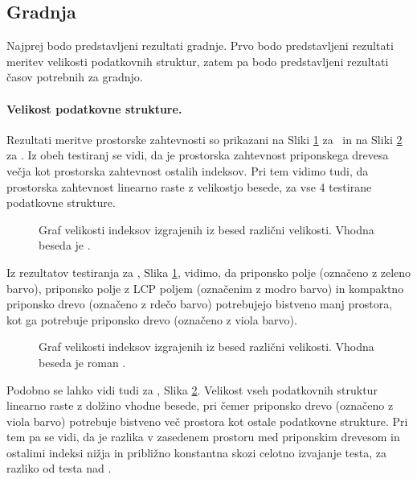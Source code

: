 \subsection{Gradnja}
Najprej bodo predstavljeni rezultati gradnje. Prvo bodo predstavljeni rezultati meritev velikosti podatkovnih struktur, zatem pa bodo predstavljeni rezultati časov potrebnih za gradnjo.

\paragraph{Velikost podatkovne strukture.}

Rezultati meritve prostorske zahtevnosti so prikazani na Sliki \ref{fig:VelikostGraf} za \DNK\ in na Sliki \ref{fig:VelikostGrafSLO} za \NK. Iz obeh testiranj se vidi, da je prostorska zahtevnost priponskega drevesa večja kot prostorska zahtevnost ostalih indeksov. Pri tem vidimo tudi, da prostorska zahtevnost linearno raste z velikostjo besede, za vse 4 testirane podatkovne strukture.

\begin{figure}[htb]
    \centering
    
    \caption{Graf velikosti indeksov izgrajenih iz besed različni velikosti. Vhodna beseda je \DNK.} 
    \label{fig:VelikostGraf}
\end{figure}

Iz rezultatov testiranja za \DNK, Slika \ref{fig:VelikostGraf}, vidimo, da priponsko polje (označeno z zeleno barvo), priponsko polje z LCP poljem (označenim z modro barvo) in kompaktno priponsko drevo (označeno z rdečo barvo) potrebujejo bistveno manj prostora, kot ga potrebuje priponsko drevo (označeno z viola barvo).

\begin{figure}[tb]
    \centering
    
    \caption{Graf velikosti indeksov izgrajenih iz besed različni velikosti. Vhodna beseda je roman \NK.} 
    \label{fig:VelikostGrafSLO}
\end{figure}

Podobno se lahko vidi tudi za \NK, Slika \ref{fig:VelikostGrafSLO}. Velikost vseh podatkovnih struktur linearno raste z dolžino vhodne besede, pri čemer priponsko drevo (označeno z viola barvo) potrebuje bistveno več prostora kot ostale podatkovne strukture. Pri tem pa se vidi, da je razlika v zasedenem prostoru med priponskim drevesom in ostalimi indeksi nižja in približno konstantna skozi celotno izvajanje testa, za razliko od testa nad \DNK.


